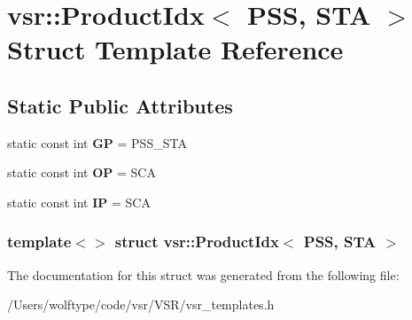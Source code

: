 \hypertarget{structvsr_1_1_product_idx_3_01_p_s_s_00_01_s_t_a_01_4}{\section{vsr\-:\-:Product\-Idx$<$ P\-S\-S, S\-T\-A $>$ Struct Template Reference}
\label{structvsr_1_1_product_idx_3_01_p_s_s_00_01_s_t_a_01_4}
}
\subsection*{Static Public Attributes}
\begin{DoxyCompactItemize}
\item 
\hypertarget{structvsr_1_1_product_idx_3_01_p_s_s_00_01_s_t_a_01_4_ae4f601ea7c6292df0a56c4bcbc22d19d}{static const int {\bfseries G\-P} = P\-S\-S\-\_\-\-S\-T\-A}\label{structvsr_1_1_product_idx_3_01_p_s_s_00_01_s_t_a_01_4_ae4f601ea7c6292df0a56c4bcbc22d19d}

\item 
\hypertarget{structvsr_1_1_product_idx_3_01_p_s_s_00_01_s_t_a_01_4_a54ad31638106733f530e7d8169049b2c}{static const int {\bfseries O\-P} = S\-C\-A}\label{structvsr_1_1_product_idx_3_01_p_s_s_00_01_s_t_a_01_4_a54ad31638106733f530e7d8169049b2c}

\item 
\hypertarget{structvsr_1_1_product_idx_3_01_p_s_s_00_01_s_t_a_01_4_abf2aa3be102a59a17875dd23546ad5d2}{static const int {\bfseries I\-P} = S\-C\-A}\label{structvsr_1_1_product_idx_3_01_p_s_s_00_01_s_t_a_01_4_abf2aa3be102a59a17875dd23546ad5d2}

\end{DoxyCompactItemize}
\subsubsection*{template$<$$>$ struct vsr\-::\-Product\-Idx$<$ P\-S\-S, S\-T\-A $>$}



The documentation for this struct was generated from the following file\-:\begin{DoxyCompactItemize}
\item 
/\-Users/wolftype/code/vsr/\-V\-S\-R/vsr\-\_\-templates.\-h\end{DoxyCompactItemize}

